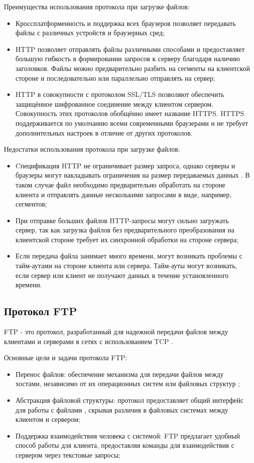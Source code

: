 	Преимущества использования протокола при загрузке файлов:
	\begin{itemize}[label=$\bullet$]
		\item Кроссплатформенность и поддержка всех браузеров позволяет передавать файлы с различных устройств и браузерных сред;
		\item HTTP позволяет отправлять файлы различными способами и предоставляет большую гибкость в формировании запросов к серверу благодаря наличию заголовков. Файлы можно предварительно разбить на сегменты на клиентской стороне и последовательно или параллельно отправлять на сервер;
		\item HTTP в совокупности с протоколом SSL/TLS позволяют обеспечить защищённое шифрованное соединение между клиентом сервером. Совокупность этих протоколов обобщённо имеет название HTTPS. HTTPS поддерживается по умолчанию всеми современными браузерами и не требует дополнительных настроек в отличие от других протоколов.
	\end{itemize}
	
	 Недостатки использования протокола при загрузке файлов:
	\begin{itemize}[label=$\bullet$]
		\item Cпецификация HTTP не ограничивает размер запроса, однако серверы и браузеры могут накладывать ограничения на размер передаваемых данных \cite{rfcHttp10}. В таком случае файл необходимо предварительно обработать на стороне клиента и отправлять данные несколькими запросами в виде, например, сегментов;
		\item При отправке больших файлов HTTP-запросы могут сильно загружать сервер, так как загрузка файлов без предварительного преобразования на клиентской стороне требует их синхронной обработки на стороне сервера;
		\item Если передача файла занимает много времени, могут возникать проблемы с тайм-аутами на стороне клиента или сервера. Тайм-ауты могут возникать, если сервер или клиент не получают данных в течение установленного времени.
	\end{itemize}

\subsection{Протокол FTP}
	FTP - это протокол, разработанный для надежной передачи файлов
	между клиентами и серверами в сетях с использованием TCP \cite{rfcFtp}.
	
	Основные цели и задачи протокола FTP:
	\begin{itemize}[label=$\bullet$]
		\item Перенос файлов: обеспечение механизма для передачи файлов между хостами, независимо от их операционных систем или файловых структур \cite{rfcFtp};
		\item Абстракция файловой структуры: протокол предоставляет общий интерфейс для работы с файлами \cite{rfcFtp}, скрывая различия в файловых системах между клиентом и сервером;
		\item Поддержка взаимодействия человека с системой: FTP предлагает удобный способ работы для клиента, предоставляя команды для взаимодействия с сервером через текстовые запросы;
	\end{itemize}
	
